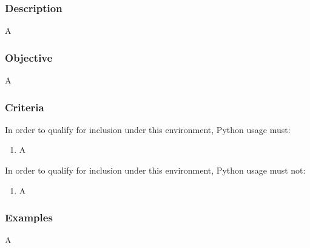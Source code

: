 		\subsubsection{Description}

			A

		\subsubsection{Objective}

			A

		\subsubsection{Criteria}

			In order to qualify for inclusion under this environment, Python usage must:

			\begin{enumerate}
        		\item A
        	\end{enumerate}

			In order to qualify for inclusion under this environment, Python usage must not:

			\begin{enumerate}
        		\item A
        	\end{enumerate}

		\subsubsection{Examples}

			A
